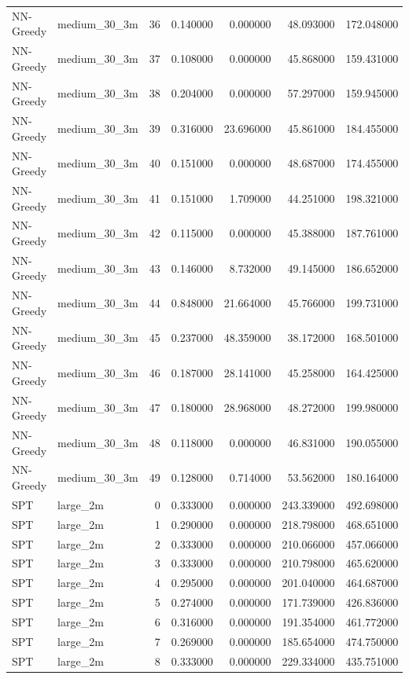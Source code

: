 \begin{tabular}{llrrrrr}
NN-Greedy & medium_30_3m & 36 & 0.140000 & 0.000000 & 48.093000 & 172.048000 \\
NN-Greedy & medium_30_3m & 37 & 0.108000 & 0.000000 & 45.868000 & 159.431000 \\
NN-Greedy & medium_30_3m & 38 & 0.204000 & 0.000000 & 57.297000 & 159.945000 \\
NN-Greedy & medium_30_3m & 39 & 0.316000 & 23.696000 & 45.861000 & 184.455000 \\
NN-Greedy & medium_30_3m & 40 & 0.151000 & 0.000000 & 48.687000 & 174.455000 \\
NN-Greedy & medium_30_3m & 41 & 0.151000 & 1.709000 & 44.251000 & 198.321000 \\
NN-Greedy & medium_30_3m & 42 & 0.115000 & 0.000000 & 45.388000 & 187.761000 \\
NN-Greedy & medium_30_3m & 43 & 0.146000 & 8.732000 & 49.145000 & 186.652000 \\
NN-Greedy & medium_30_3m & 44 & 0.848000 & 21.664000 & 45.766000 & 199.731000 \\
NN-Greedy & medium_30_3m & 45 & 0.237000 & 48.359000 & 38.172000 & 168.501000 \\
NN-Greedy & medium_30_3m & 46 & 0.187000 & 28.141000 & 45.258000 & 164.425000 \\
NN-Greedy & medium_30_3m & 47 & 0.180000 & 28.968000 & 48.272000 & 199.980000 \\
NN-Greedy & medium_30_3m & 48 & 0.118000 & 0.000000 & 46.831000 & 190.055000 \\
NN-Greedy & medium_30_3m & 49 & 0.128000 & 0.714000 & 53.562000 & 180.164000 \\
SPT & large_2m & 0 & 0.333000 & 0.000000 & 243.339000 & 492.698000 \\
SPT & large_2m & 1 & 0.290000 & 0.000000 & 218.798000 & 468.651000 \\
SPT & large_2m & 2 & 0.333000 & 0.000000 & 210.066000 & 457.066000 \\
SPT & large_2m & 3 & 0.333000 & 0.000000 & 210.798000 & 465.620000 \\
SPT & large_2m & 4 & 0.295000 & 0.000000 & 201.040000 & 464.687000 \\
SPT & large_2m & 5 & 0.274000 & 0.000000 & 171.739000 & 426.836000 \\
SPT & large_2m & 6 & 0.316000 & 0.000000 & 191.354000 & 461.772000 \\
SPT & large_2m & 7 & 0.269000 & 0.000000 & 185.654000 & 474.750000 \\
SPT & large_2m & 8 & 0.333000 & 0.000000 & 229.334000 & 435.751000 \\

\end{tabular}
